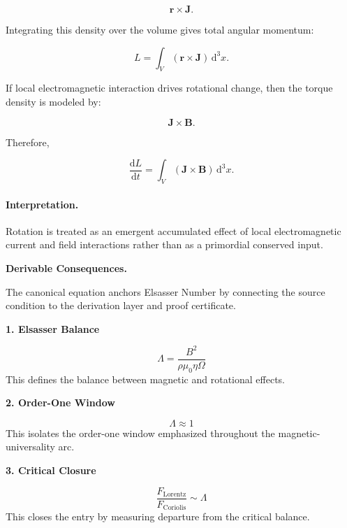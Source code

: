 \begin{equation}
\mathbf{r}\times\mathbf{J}.
\end{equation}

Integrating this density over the volume gives total angular momentum:

\begin{equation}
\boxed{
L
=
\int_V
(\mathbf{r}\times\mathbf{J})
\,\mathrm{d}^3x .
}
\end{equation}

If local electromagnetic interaction drives rotational change, then the torque density is modeled by:

\begin{equation}
\mathbf{J}\times\mathbf{B}.
\end{equation}

Therefore,

\begin{equation}
\boxed{
\frac{\mathrm{d}L}{\mathrm{d}t}
=
\int_V
(\mathbf{J}\times\mathbf{B})
\,\mathrm{d}^3x .
}
\end{equation}

\paragraph{Interpretation.}
Rotation is treated as an emergent accumulated effect of local electromagnetic current and field interactions rather than as a primordial conserved input.

\par\vspace{0.35em}
\noindent\textbf{Derivable Consequences.}\quad
\begingroup
\footnotesize
\raggedright
The canonical equation anchors Elsasser Number by connecting the source condition to the derivation layer and proof certificate.
\par\endgroup

\noindent\textbf{1. Elsasser Balance}\par
\[
\Lambda=\frac{B^2}{\rho\mu_0\eta\Omega}
\]
\noindent This defines the balance between magnetic and rotational effects.\par
\noindent\textbf{2. Order-One Window}\par
\[
\Lambda\approx 1
\]
\noindent This isolates the order-one window emphasized throughout the magnetic-universality arc.\par
\noindent\textbf{3. Critical Closure}\par
\[
\frac{F_{\mathrm{Lorentz}}}{F_{\mathrm{Coriolis}}}\sim\Lambda
\]
\noindent This closes the entry by measuring departure from the critical balance.\par

